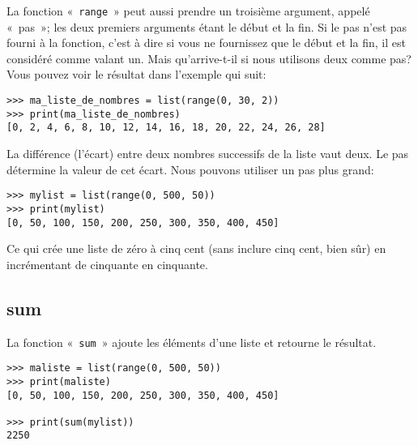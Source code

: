 La fonction «~\texttt{range}~» peut aussi prendre un troisième argument, appelé «~pas~»; les deux premiers arguments étant le début et la fin.
Si le pas n'est pas fourni à la fonction, c'est à dire si vous ne fournissez que le début et la fin, il est considéré comme valant un. Mais qu'arrive-t-il si nous utilisons deux comme pas? Vous pouvez voir le résultat dans l'exemple qui suit:
\begin{Verbatim}[frame=single,rulecolor=\color{gray}]
>>> ma_liste_de_nombres = list(range(0, 30, 2))
>>> print(ma_liste_de_nombres)
[0, 2, 4, 6, 8, 10, 12, 14, 16, 18, 20, 22, 24, 26, 28]
\end{Verbatim}

La différence (l'écart) entre deux nombres successifs de la liste vaut deux. Le pas détermine la valeur de cet écart. Nous pouvons utiliser un pas plus grand:
\begin{Verbatim}[frame=single,rulecolor=\color{gray}]
>>> mylist = list(range(0, 500, 50))
>>> print(mylist)
[0, 50, 100, 150, 200, 250, 300, 350, 400, 450]
\end{Verbatim}

Ce qui crée une liste de zéro à cinq cent (sans inclure cinq cent, bien sûr) en incrémentant de cinquante en cinquante.

\subsection*{sum}

La fonction «~\texttt{sum}~» ajoute les éléments d'une liste et retourne le résultat.
\begin{Verbatim}[frame=single,rulecolor=\color{gray}]
>>> maliste = list(range(0, 500, 50))
>>> print(maliste)
[0, 50, 100, 150, 200, 250, 300, 350, 400, 450]

>>> print(sum(mylist))
2250
\end{Verbatim}

